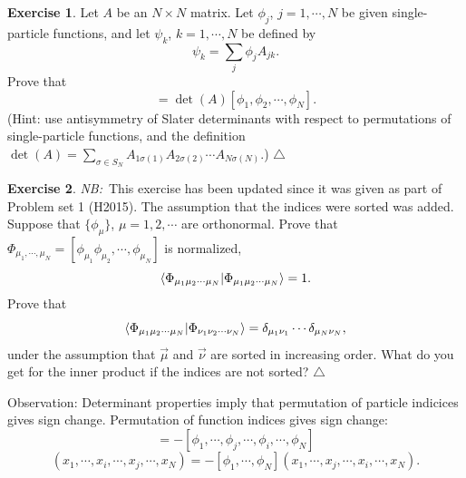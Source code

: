 \documentclass{report}
\theoremstyle{plain}
\theoremstyle{definition}
\newtheorem{exerc}{Exercise}[chapter]
\newcommand\xqed[1]{%
  \leavevmode\unskip\penalty9999 \hbox{}\nobreak\hfill
  \quad\hbox{#1}}
\newcommand\demo{\xqed{$\triangle$}}
\newenvironment{exercise}{\bigskip\begin{exerc}}{\demo\end{exerc}\bigskip}
\newcommand{\note}[1]{{\color{red}\emph{NB:}~#1}}
\begin{document}
\begin{exercise}\label{exercise:slater3}
   Let $A$ be an $N\times N$ matrix. Let $\phi_j$, $j=1,\cdots,N$ be
   given single-particle functions, and let $\psi_k$, $k=1,\cdots,N$ be
   defined by
   \begin{equation}
     \psi_k = \sum_j \phi_j A_{jk}.
   \end{equation}
   Prove that
   \begin{equation}
     [\psi_1,\psi_2,\cdots,\psi_N] =
     \det(A)[\phi_1,\phi_2,\cdots,\phi_N].
   \end{equation}
   (Hint: use antisymmetry of Slater determinants with respect to
   permutations of single-particle functions, and the definition
   $\det(A) = \sum_{\sigma\in S_N} A_{1\sigma(1)}A_{2\sigma(2)}
   \cdots A_{N\sigma(N)}.$)
 \end{exercise}


\begin{exercise}\label{exercise:slater2}\note{This exercise has been
    updated since it was given as part of Problem set 1 (H2015). The
    assumption that the indices were sorted was added.}
  Suppose that $\{\phi_\mu\}$, $\mu=1,2,\cdots$ are orthonormal.  Prove
  that $\Phi_{\mu_1,\cdots,\mu_N} =
  [\phi_{\mu_1}\phi_{\mu_2},\cdots,\phi_{\mu_N}]$ is normalized,
  \[ \braket{\Phi_{{\mu_1\mu_2\cdots \mu_N}}|\Phi_{{\mu_1\mu_2\cdots \mu_N}}} = 1. \]
  Prove that
  \[ \braket{\Phi_{\mu_1\mu_2\cdots
      \mu_N}|\Phi_{\nu_1\nu_2\cdots\nu_N}} = \delta_{\mu_1\nu_1}\cdots
  \delta_{\mu_N\nu_N}, \]
  under the assumption that $\vec{\mu}$ and $\vec{\nu}$ are sorted in
  increasing order. What do you get for the inner product if the indices are not sorted?
\end{exercise}



Observation: Determinant properties imply that permutation of particle
indicices gives sign change. Permutation of function indices gives
sign change:
\begin{equation}
  [\phi_1,\cdots,\phi_i,\cdots,\phi_j,\cdots,\phi_N] =
  -[\phi_1,\cdots,\phi_j,\cdots,\phi_i,\cdots,\phi_N]
\end{equation}
\begin{equation}
  [\phi_1,\cdots,\phi_N](x_1,\cdots,x_i,\cdots,x_j,\cdots,x_N) =
  -[\phi_1,\cdots,\phi_N](x_1,\cdots,x_j,\cdots,x_i,\cdots,x_N). 
\end{equation}
\end{document}
